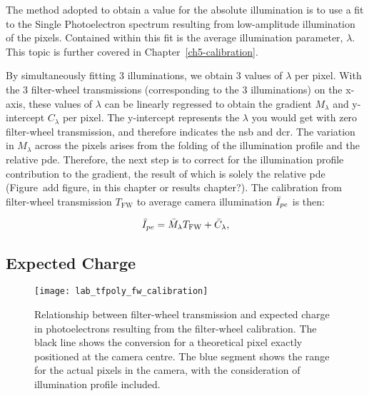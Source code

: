 The method adopted to obtain a value for the absolute illumination is to use a fit to the Single Photoelectron spectrum resulting from low-amplitude illumination of the pixels. Contained within this fit is the average illumination parameter, $\lambda$. This topic is further covered in Chapter~\ref{ch5-calibration}. 

By simultaneously fitting 3 illuminations, we obtain 3 values of $\lambda$ per pixel. With the 3 filter-wheel transmissions (corresponding to the 3 illuminations) on the x-axis, these values of $\lambda$ can be linearly regressed to obtain the gradient $M_\lambda$ and y-intercept $C_\lambda$ per pixel. The y-intercept represents the $\lambda$ you would get with zero filter-wheel transmission, and therefore indicates the \gls{nsb} and \gls{dcr}. The variation in $M_\lambda$ across the pixels arises from the folding of the illumination profile and the relative \gls{pde}. Therefore, the next step is to correct for the illumination profile contribution to the gradient, the result of which is solely the relative \gls{pde} (Figure~{add figure, in this chapter or results chapter?}). The calibration from filter-wheel transmission $T_\text{FW}$ to average camera illumination $\bar{I}_{pe}$ is then:

\begin{equation} \label{eq:average_camera_illumination}
\bar{I}_{pe} = \bar{M}_\lambda T_\text{FW} + \bar{C}_\lambda,
\end{equation}

\subsection{Expected Charge}

\begin{figure}
	\centering
    \texttt{[image: lab\_tfpoly\_fw\_calibration]} 
	\caption[Calibration from Filter-Wheel Transmission to Expected ]{Relationship between filter-wheel transmission and expected charge in photoelectrons resulting from the filter-wheel calibration. The black line shows the conversion for a theoretical pixel exactly positioned at the camera centre. The blue segment shows the range for the actual pixels in the camera, with the consideration of illumination profile included.}
	\label{fig:fw_calibration}
\end{figure}

